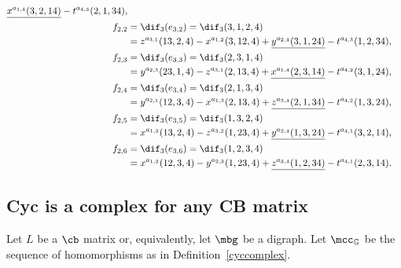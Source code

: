 \begin{example}
\begin{align*}
\underline{x^{a_{1,4}}(3,2,14)}-t^{a_{4,3}}(2,1,34),\\
f_{2,2}&= \dif_3(e_{3,2})=
\dif_3(3,1,2,4) \\&= z^{a_{3,1}}(13,2,4)-x^{a_{1,2}}(3,12,4)+
\underline{y^{a_{2,4}}(3,1,24)}-t^{a_{4,3}}(1,2,34),\\
f_{2,3}&=  \dif_3(e_{3,3})=
\dif_3(2,3,1,4)\\ &= y^{a_{2,3}}(23,1,4)-z^{a_{3,1}}(2,13,4)+
\underline{x^{a_{1,4}}(2,3,14)}-t^{a_{4,2}}(3,1,24),\\
f_{2,4}&= \dif_3(e_{3,4})=
\dif_3(2,1,3,4)\\ &= y^{a_{2,1}}(12,3,4)-x^{a_{1,3}}(2,13,4)
+\underline{z^{a_{3,4}}(2,1,34)}-t^{a_{4,2}}(1,3,24),\\
f_{2,5}&=\dif_3(e_{3,5})=
\dif_3(1,3,2,4)\\ &= x^{a_{1,3}}(13,2,4)-z^{a_{3,2}}(1,23,4)+
\underline{y^{a_{2,4}}(1,3,24)}-t^{a_{4,1}}(3,2,14),\\
f_{2,6}&= \dif_3(e_{3,6})= 
\dif_3(1,2,3,4)\\ &= x^{a_{1,2}}(12,3,4)-y^{a_{2,3}}(1,23,4)+
\underline{z^{a_{3,4}}(1,2,34)}-t^{a_{4,1}}(2,3,14).
\end{align*}
\end{example}

\subsection{Cyc is a complex for any CB matrix}\label{cyc-complex-cb}

 Let $L$ be a $\cb$ matrix or, equivalently, let $\mbg$ be a
digraph. Let $\mcc_{\mathbb{G}}$ be the sequence of homomorphisms as
in Definition~\ref{cyccomplex}.

